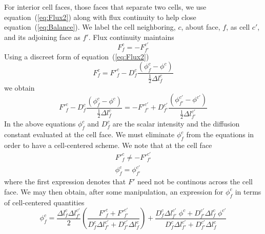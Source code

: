 \documentclass{article}
\begin{document}
For interior cell faces, those faces that separate two cells, we use
equation~(\ref{eq:Flux2}) along with flux continuity to help close
equation~(\ref{eq:Balance}).
We label the cell neighboring, $c$, about face, $f$, as cell $c'$, and its
adjoining face as $f'$.
Flux continuity maintains
\begin{equation}
        F^{c}_{f} = - F^{c'}_{f'}
\end{equation}
Using a discreet form of equation~(\ref{eq:Flux2})
\begin{equation}
        F^{c}_{f} = 
        {F'}^{c}_{f} - D^{c}_{f} \frac{(\phi^{c}_{f} - \phi^{c})}
                                      {\frac{1}{2}\Delta l^{c}_{f}}
\label{eq:Flux3}
\end{equation}
we obtain
\begin{equation}
        {F'}^{c}_{f} - D^{c}_{f} \frac{(\phi^{c}_{f} - \phi^{c})}
                                    {\frac{1}{2}\Delta l^{c}_{f}}
    = - {F'}^{c'}_{f'} + D^{c'}_{f'} \frac{(\phi^{c'}_{f'} - \phi^{c'})}
                                        {\frac{1}{2}\Delta l^{c'}_{f'}}
\end{equation}
In the above equations $\phi^{c}_{f}$ and $D^{c}_{f}$
are the scalar intensity and the diffusion constant evaluated
at the cell face.
We must eliminate $\phi^{c}_{f}$ from the equations in order to have a
cell-centered scheme.
We note that at the cell face
\begin{gather}
        {F'}^{c}_{f} \ne - {F'}^{c'}_{f'} \\
        \phi^{c}_{f} = \phi^{c'}_{f'}
\end{gather}
where the first expression denotes that $F'$ need not be continous across
the cell face.
We may then obtain, after some manipulation,
an expression for $\phi^{c}_{f}$ in terms of cell-centered
quantities
\begin{equation}
        \phi^{c}_{f} =  \frac{\Delta l^{c}_{f} \Delta l^{c'}_{f'}}{2}
                        \left(
                        \frac
                        {  {F'}^{c}_{f} + {F'}^{c'}_{f'}
                        }
                        { D^{c}_{f} \Delta l^{c'}_{f'}
                            + D^{c'}_{f'} \Delta l^{c}_{f}
                        }
                        \right)
                        +
                        \frac
                        { D^{c}_{f} \Delta l^{c'}_{f'} \; \phi^{c} 
                            + D^{c'}_{f'} \Delta l^{c}_{f} \; \phi^{c'} 
                        }
                        { D^{c}_{f} \Delta l^{c'}_{f'}
                            + D^{c'}_{f'} \Delta l^{c}_{f}
                        }
\label{eq:phicf}
\end{equation}
\end{document}
